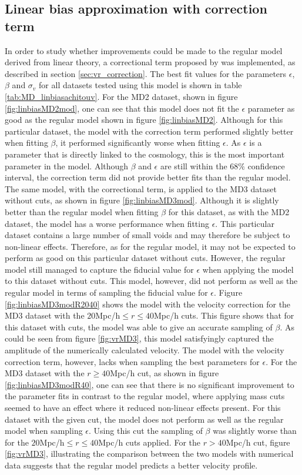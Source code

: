 \subsection{Linear bias approximation with correction term}
In order to study whether improvements could be made to the regular model derived from linear theory, a correctional term proposed by \cite{Achitouv_streaming} was implemented, as described in section \ref{sec:vr_correction}. The best fit values for the parameters $\epsilon$, $\beta$ and $\sigma_v$ for all datasets tested using this model is shown in table \ref{tab:MD_linbiasachitouv}. For the MD2 dataset, shown in figure \ref{fig:linbiasMD2mod}, one can see that this model does not fit the $\epsilon$ parameter as good as the regular model shown in figure \ref{fig:linbiasMD2}. Although for this particular dataset, the model with the correction term performed slightly better when fitting $\beta$, it performed significantly worse when fitting $\epsilon$. As $\epsilon$ is a parameter that is directly linked to the cosmology, this is the most important parameter in the model. Although $\beta$ and $\epsilon$ are still within the $68\%$ confidence interval, the correction term did not provide better fits than the regular model.\\\indent
The same model, with the correctional term, is applied to the MD3 dataset without cuts, as shown in figure \ref{fig:linbiasMD3mod}. Although it is slightly better than the regular model when fitting $\beta$ for this dataset, as with the MD2 dataset, the model has a worse performance when fitting $\epsilon$. This particular dataset contains a large number of small voids and may therefore be subject to non-linear effects. Therefore, as for the regular model, it may not be expected to perform as good on this particular dataset without cuts. However, the regular model still managed to 
capture the fiducial value for $\epsilon$ when applying the model to this dataset without cuts. This model, however, did not perform as well as the regular model in terms of sampling the fiducial value for $\epsilon$.
Figure \ref{fig:linbiasMD3modR2040} shows the model with the velocity correction for the MD3 dataset with the $20$Mpc/h$\leq r\leq 40$Mpc/h cuts. This figure shows that for this dataset with cuts, the model was able to give an accurate sampling of $\beta$. As could be seen from figure \ref{fig:vrMD3}, this model satisfyingly captured the amplitude of the numerically calculated velocity. The model with the velocity correction term, however, lacks when sampling the best parameters for $\epsilon$. For the MD3 dataset with the $r \geq 40$Mpc/h cut, as shown in figure \ref{fig:linbiasMD3modR40}, one can see that there is no significant improvement to the parameter fits in contrast to the regular model, where applying mass cuts seemed to have an effect where it reduced non-linear effects present. For this dataset with the given cut, the model does not perform as well as the regular model when sampling $\epsilon$. Using this cut the sampling of $\beta$ was slightly worse than for the $20$Mpc/h$\leq r\leq 40$Mpc/h cuts applied. For the $r>40$Mpc/h cut, figure \ref{fig:vrMD3}, illustrating the comparison between the two models with numerical data suggests that the regular model predicts a better velocity profile.\\\indent
